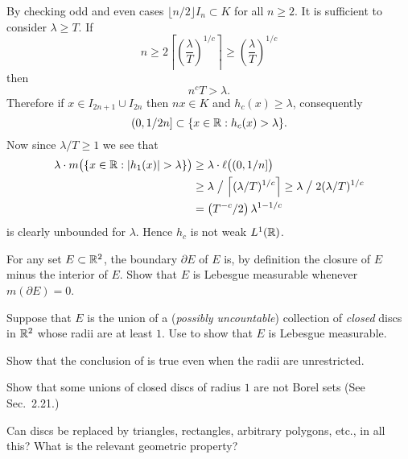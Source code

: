 \begin{enumerate}
\begin{itemize}
By checking odd and even cases \(\lfloor n/2\rfloor I_n \subset K\)
for all \(n\geq 2\). 
It is sufficient to consider \(\lambda \geq T\).
If 
\begin{equation*}
n \geq 2\left\lceil \left(\frac{\lambda}{T}\right)^{1/c} \right\rceil
  \geq        \left(\frac{\lambda}{T}\right)^{1/c} 
\end{equation*}
then
\begin{equation*}
n^c T > \lambda.
\end{equation*}
Therefore if \(x \in I_{2n+1} \cup I_{2n}\) then \(nx \in K\) 
and \(h_c(x) \geq \lambda\), consequently
\begin{equation*}
(0,1/2n] \subset \{x\in\mathbb{R}: h_c(x)> \lambda\}.
\end{equation*}
Now since \(\lambda/T \geq 1\) we see that
\begin{align*}
\lambda \cdot m\bigl( \{x\in\mathbb{R}: |h_1(x)| > \lambda\}\bigl) 
&\geq \lambda \cdot \ell\bigl((0,1/n]\bigr) \\
&\geq \lambda \bigm/ 
      \left\lceil (\lambda/T)^{1/c} \right\rceil 
 \geq \lambda \bigm/ 2 (\lambda/T)^{1/c} \\
&= \left(T^{-c}/2\right) \lambda^{1-1/c}
\end{align*}
is clearly unbounded for \(\lambda\).
Hence \(h_c\) is not weak \(L^1(\mathbb{R})\).
\end{itemize}


\begin{excopy}
\begin{itemize}
For any set \(E\subset \mathbb{R}^2\), the boundary \(\partial E\) of $E$ is,
by definition the closure of $E$ minus the interior of $E$. Show that
$E$ is Lebesgue measurable whenever \(m(\partial E) = 0\).

Suppose that $E$ is the union of a (\emph{possibly uncountable}) collection
of \emph{closed} discs in \(\mathbb{R}^2\) whose radii are at least $1$.
Use  to show that $E$ is Lebesgue measurable.

Show that the conclusion of  is true even when the
radii are unrestricted.

Show that some unions of closed discs of radius $1$
are not Borel sets (See Sec.~2.21.)

Can discs be replaced by triangles, rectangles, arbitrary polygons, etc.,
in all this?
What is the relevant geometric property?
\end{itemize}
\end{excopy}


\end{enumerate}
